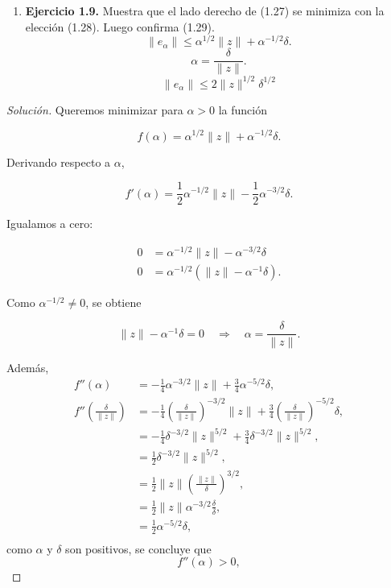 \documentclass[12pt,spanish,mexico]{article}
\numberwithin{equation}{section}
\theoremstyle{definition}
\theoremstyle{remark}
\newenvironment{solution}{\begin{proof}[Solución]}{\end{proof}}
\begin{document}
\begin{enumerate}[label=(\alph*)]
\begin{enumerate}
        \item \textbf{Ejercicio 1.9.} Muestra que el lado derecho de (1.27) se minimiza con la elección (1.28). Luego confirma (1.29).
        \begin{equation}
            \|e_\alpha\| \leq \alpha^{1/2}\|z\|+\alpha^{-1/2} \delta.
            \tag{1.27}
        \end{equation}
        \begin{equation}
            \alpha = \frac{\delta}{\|z\|}.
            \tag{1.28}
        \end{equation}
        \begin{equation}
            \|e_\alpha\|\leq 2\|z\|^{1/2} \delta^{1/2}
            \tag{1.29}
        \end{equation}
    \end{enumerate}
    \begin{solution}
Queremos minimizar para $\alpha>0$ la función

\[
f(\alpha)=\alpha^{1/2}\|z\|+\alpha^{-1/2}\delta.
\]

Derivando respecto a $\alpha$,

\[
f'(\alpha)
=
\frac{1}{2}\alpha^{-1/2}\|z\|
-
\frac{1}{2}\alpha^{-3/2}\delta.
\]

Igualamos a cero:

\begin{align*}
0
&=
\alpha^{-1/2}\|z\|
-
\alpha^{-3/2}\delta \\
0
&=
\alpha^{-1/2}\left(\|z\|-\alpha^{-1}\delta\right).
\end{align*}

Como $\alpha^{-1/2}\neq 0$, se obtiene

\[
\|z\|-\alpha^{-1}\delta=0
\quad\Rightarrow\quad
\alpha=\frac{\delta}{\|z\|}.
\]

Además,
\begin{align*}
f''(\alpha)
&=
-\frac{1}{4}\alpha^{-3/2}\|z\|+
\frac{3}{4}\alpha^{-5/2}\delta,\\
f''\left(\frac{\delta}{\|z\|}\right)
&=
-\frac{1}{4}\left(\frac{\delta}{\|z\|}\right)^{-3/2}\|z\|+
\frac{3}{4}\left(\frac{\delta}{\|z\|}\right)^{-5/2}\delta,\\
&=
-\frac{1}{4}\delta^{-3/2}\|z\|^{5/2}+
\frac{3}{4}\delta^{-3/2}\|z\|^{5/2},\\
&=
\frac{1}{2}\delta^{-3/2}\|z\|^{5/2},\\
&=
\frac{1}{2}\|z\|\left(\frac{\|z\|}{\delta}\right)^{3/2},\\
&=
\frac{1}{2}\|z\|\alpha^{-3/2}\frac{\delta}{\delta},\\
&=\frac{1}{2}\alpha^{-5/2}\delta,\\
\end{align*}
como $\alpha$ y $\delta$ son positivos, se concluye que 
\[
f''(\alpha)>0,
\]


\end{solution}
\end{enumerate}
\end{document}
